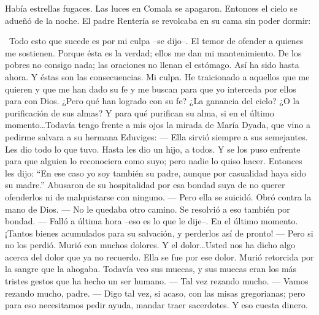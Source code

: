   Había estrellas fugaces. Las luces en Comala se apagaron.
\pend
%
\pstart
  Entonces el cielo se adueñó de la noche.
\pend
%
\pstart
  El padre Rentería se revolcaba en su cama sin poder dormir:

  \guillemotleft Todo esto que sucede es por mi culpa --se dijo--. El temor de ofender a quienes me sostienen. Porque ésta es la verdad; ellos me dan mi mantenimiento. De los pobres no consigo nada; las oraciones no llenan el estómago. Así ha sido hasta ahora. Y éstas son las consecuencias. Mi culpa. He traicionado a aquellos que me quieren y que me han dado su fe y me buscan para que yo interceda por ellos para con Dios. ¿Pero qué han logrado con su fe? ¿La ganancia del cielo? ¿O la purificación de sus almas? Y para qué purifican su alma, si en el último momento\ldots Todavía tengo frente a mis ojos la mirada de María Dyada, que vino a pedirme salvara a su hermana Eduviges:
\pend
%
\pstart
  \guillemotright --- Ella sirvió siempre a sus semejantes. Les dio todo lo que tuvo. Hasta les dio un hijo, a todos. Y se los puso enfrente para que alguien lo reconociera como suyo; pero nadie lo quiso hacer. Entonces les dijo: ``En ese caso yo soy también su padre, aunque por casualidad haya sido su madre.'' Abusaron de su hospitalidad por esa bondad suya de no querer ofenderlos ni de malquistarse con ninguno.
\pend
%
\pstart
  \guillemotright --- Pero ella se suicidó. Obró contra la mano de Dios.
\pend
%
\pstart
  \guillemotright --- No le quedaba otro camino. Se resolvió a eso también por bondad.
\pend
%
\pstart
  \guillemotright --- Falló a última hora --eso es lo que le dije--. En el último momento. ¡Tantos bienes acumulados para su salvación, y perderlos así de pronto!
\pend
%
\pstart
  \guillemotright --- Pero si no los perdió. Murió con muchos dolores. Y el dolor\ldots Usted nos ha dicho algo acerca del dolor que ya no recuerdo. Ella se fue por ese dolor. Murió retorcida por la sangre que la ahogaba. Todavía veo sus muecas, y sus muecas eran los más tristes gestos que ha hecho un ser humano.
\pend
%
\pstart
  \guillemotright --- Tal vez rezando mucho.
\pend
%
\pstart
  \guillemotright --- Vamos rezando mucho, padre.
\pend
%
\pstart
  \guillemotright --- Digo tal vez, si acaso, con las misas gregorianas; pero para eso necesitamos pedir ayuda, mandar traer sacerdotes. Y eso cuesta dinero.
